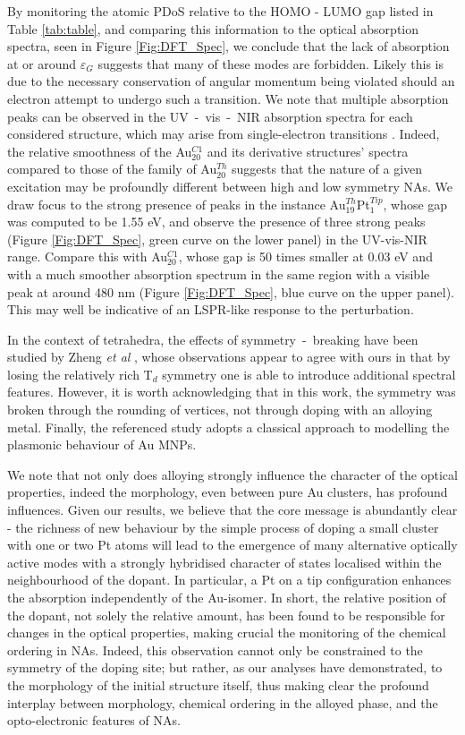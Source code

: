 By monitoring the atomic PDoS relative to the HOMO - LUMO gap listed in Table \ref{tab:table}, and comparing this information to the optical absorption spectra, seen in Figure \ref{Fig:DFT_Spec}, we conclude that the lack of absorption at or around $\varepsilon_{G}$ suggests that many of these modes are forbidden. Likely this is due to the necessary conservation of angular momentum being violated should an electron attempt to undergo such a  transition. We note that multiple absorption peaks can be observed in the UV~-~vis~-~NIR absorption spectra for each considered structure, which may arise from single-electron transitions \cite{ThreeStages}. Indeed, the relative smoothness of the Au$_{20}^{C1}$ and its derivative structures' spectra compared to those of the family of Au$_{20}^{Th}$ suggests that the nature of a given excitation may be profoundly different between high and low symmetry NAs. We draw focus to the strong presence of peaks in the instance Au$_{19}^{Th}$Pt$_{1}^{Tip}$, whose gap was computed to be 1.55 eV, and observe the presence of three strong peaks (Figure \ref{Fig:DFT_Spec}, green curve on the lower panel) in the UV-vis-NIR range. Compare this with Au$_{20}^{C1}$, whose gap is 50 times smaller at 0.03 eV and with a much smoother absorption spectrum in the same region with a visible peak at around 480 nm (Figure \ref{Fig:DFT_Spec}, blue curve on the upper panel). This may well be indicative of an LSPR-like response to the perturbation.

In the context of tetrahedra, the effects of symmetry~-~breaking have been studied by Zheng \textit{et al} \cite{C9NR08515G}, whose observations appear to agree with ours in that by losing the relatively rich T$_{d}$ symmetry one is able to introduce additional spectral features. However, it is worth acknowledging that in this work, the symmetry was broken through the rounding of vertices, not through doping with an alloying metal. Finally, the referenced study adopts a classical approach to modelling the plasmonic behaviour of Au MNPs.

We note that not only does alloying strongly influence the character of the optical properties, indeed the morphology, even between pure Au clusters, has profound influences. Given our results, we believe that the core message is abundantly clear - the richness of new behaviour by the simple process of doping a small cluster with one or two Pt atoms will lead to the emergence of many alternative optically active modes with a strongly hybridised character of states localised within the neighbourhood of the dopant. In particular, a Pt on a tip configuration enhances the absorption independently of the Au-isomer. In short, the relative position of the dopant, not solely the relative amount, has been found to be responsible for changes in the optical properties, making crucial the monitoring of the chemical ordering in NAs. Indeed, this observation cannot only be constrained to the symmetry of the doping site; but rather, as our analyses have demonstrated, to the morphology of the initial structure itself, thus making clear the profound interplay between morphology, chemical ordering in the alloyed phase, and the opto-electronic features of NAs.

